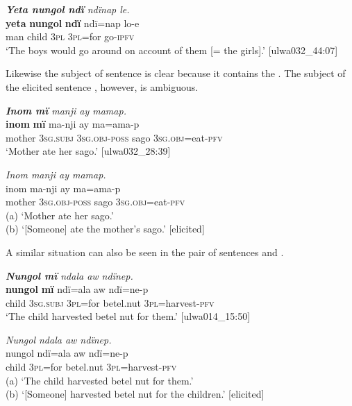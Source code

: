 \ea%
    \label{ex:det:21}
          \textit{\textbf{Yeta nungol ndï} ndïnap le.}\\
\gll    \textbf{yeta}  \textbf{nungol}  \textbf{ndï}  ndï=nap  lo-e\\
    man  child  3\textsc{pl}  \textsc{3pl}=for  go-\textsc{ipfv}\\
\glt `The boys would go around on account of them [= the girls].’ [ulwa032\_44:07]
\z

Likewise the subject of sentence  is clear because it contains the . The subject of the elicited sentence , however, is ambiguous.

\ea%
    \label{ex:det:22}
          \textit{\textbf{Inom mï} manji ay mamap.}\\
\gll    \textbf{inom}  \textbf{mï}      ma-nji      ay    ma=ama-p\\
    mother  3\textsc{sg.subj}  3\textsc{sg.obj-poss}  sago  3\textsc{sg.obj}=eat-\textsc{pfv}\\
\glt `Mother ate her sago.’ [ulwa032\_28:39]
\z

\ea%
    \label{ex:det:23}
          \textit{Inom manji ay mamap.}\\
\gll    inom  ma-nji      ay    ma=ama-p\\
    mother  3\textsc{sg.obj-poss}  sago  3\textsc{sg.obj}=eat-\textsc{pfv}\\
\glt    (a) ‘Mother ate her sago.’\\
    (b) ‘[Someone] ate the mother’s sago.’ [elicited]
\z

A similar situation can also be seen in the pair of sentences  and .

\ea%
    \label{ex:det:24}
          \textit{\textbf{Nungol mï} ndala aw ndïnep.}\\
\gll    \textbf{nungol}  \textbf{mï}      ndï=ala  aw      ndï=ne-p\\
    child  3\textsc{sg.subj}  3\textsc{pl}=for  betel.nut  3\textsc{pl}=harvest-\textsc{pfv}\\
\glt `The child harvested betel nut for them.’ [ulwa014\_15:50]
\z

\ea%
    \label{ex:det:25}
          \textit{Nungol ndala aw ndïnep.}\\
\gll    nungol  ndï=ala  aw      ndï=ne-p\\
    child  3\textsc{pl}=for  betel.nut  3\textsc{pl}=harvest-\textsc{pfv}\\
\glt    (a) ‘The child harvested betel nut for them.’\\
    (b) ‘[Someone] harvested betel nut for the children.’ [elicited]
\z


